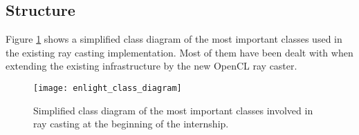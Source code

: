 \subsection{Structure}

Figure \ref{fig:enlight_class_diagram} shows a simplified class diagram of the most important classes used in the existing ray casting implementation. Most of them have been dealt with when extending the existing infrastructure by the new OpenCL ray caster.

\begin{figure}
\centering
\texttt{[image: enlight\_class\_diagram]}
\caption{Simplified class diagram of the most important classes involved in ray casting at the beginning of the internship.}
\label{fig:enlight_class_diagram}
\end{figure}

